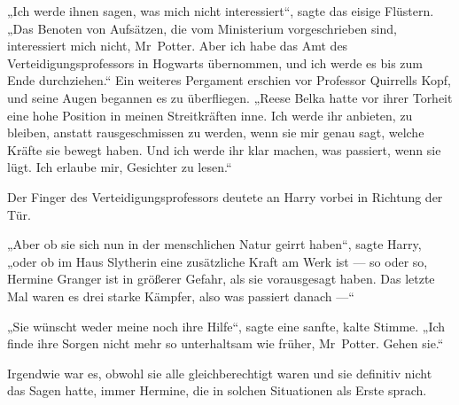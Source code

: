 „Ich werde ihnen sagen, was mich nicht interessiert“, sagte das eisige Flüstern.
„Das Benoten von Aufsätzen, die vom Ministerium vorgeschrieben sind, interessiert mich nicht, Mr~Potter. Aber ich habe das Amt des Verteidigungsprofessors in Hogwarts übernommen, und ich werde es bis zum Ende durchziehen.“ Ein weiteres Pergament erschien vor Professor Quirrells Kopf, und seine Augen begannen es zu überfliegen.
„Reese Belka hatte vor ihrer Torheit eine hohe Position in meinen Streitkräften inne. Ich werde ihr anbieten, zu bleiben, anstatt rausgeschmissen zu werden, wenn sie mir genau sagt, welche Kräfte sie bewegt haben. Und ich werde ihr klar machen, was passiert, wenn sie lügt. Ich erlaube mir, Gesichter zu lesen.“

Der Finger des Verteidigungsprofessors deutete an Harry vorbei in Richtung der Tür.

„Aber ob sie sich nun in der menschlichen Natur geirrt haben“, sagte Harry, „oder ob im Haus Slytherin eine zusätzliche Kraft am Werk ist — so oder so, Hermine Granger ist in größerer Gefahr, als sie vorausgesagt haben. Das letzte Mal waren es drei starke Kämpfer, also was passiert danach —“

„Sie wünscht weder meine noch ihre Hilfe“, sagte eine sanfte, kalte Stimme.
„Ich finde ihre Sorgen nicht mehr so unterhaltsam wie früher, Mr~Potter. Gehen sie.“

\later

Irgendwie war es, obwohl sie alle gleichberechtigt waren und sie definitiv nicht das Sagen hatte, immer Hermine, die in solchen Situationen als Erste sprach.

